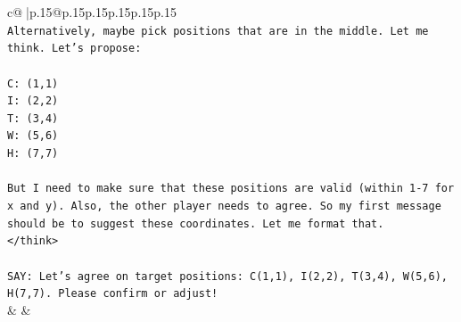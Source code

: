 \documentclass{article}
\begin{document}
{\begin{supertabular}{c@{$\;$}|p{.15\linewidth}@{}p{.15\linewidth}p{.15\linewidth}p{.15\linewidth}p{.15\linewidth}p{.15\linewidth}}
{{{\\ 
\texttt{Alternatively, maybe pick positions that are in the middle. Let me think. Let's propose:} \\
\\ 
\texttt{C: (1,1)} \\
\texttt{I: (2,2)} \\
\texttt{T: (3,4)} \\
\texttt{W: (5,6)} \\
\texttt{H: (7,7)} \\
\\ 
\texttt{But I need to make sure that these positions are valid (within 1{-}7 for x and y). Also, the other player needs to agree. So my first message should be to suggest these coordinates. Let me format that.} \\
\texttt{</think>} \\
\\ 
\texttt{SAY: Let's agree on target positions: C(1,1), I(2,2), T(3,4), W(5,6), H(7,7). Please confirm or adjust!} \\
            }
        }
    }
    & & \\ \\


\end{supertabular}}
\end{document}
